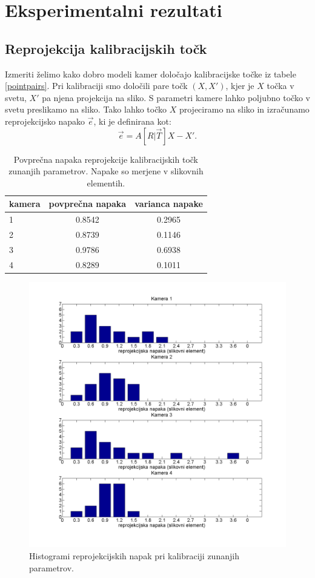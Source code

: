 \documentclass[a4paper, 12pt]{book}
\begin{document}
\chapter{Eksperimentalni rezultati}
\section{Reprojekcija kalibracijskih točk}\label{reprojectioncalibsection}
Izmeriti želimo kako dobro modeli kamer določajo kalibracijske točke iz tabele \ref{pointpairs}. Pri kalibraciji smo določili pare točk $(X, X')$, kjer je $X$ točka v svetu, $X'$ pa njena projekcija na sliko. S parametri kamere lahko poljubno točko v svetu preslikamo na sliko. Tako lahko točko $X$ projeciramo na sliko in izračunamo reprojekcijsko napako $\vec{e}$, ki je definirana kot:
\begin{equation}
\vec{e} = A[R|\vec{T}]X - X'.
\end{equation} 

\begin{table}
\centering
\begin{tabular}{| l | c | c |}
\hline
kamera & povprečna napaka & varianca napake \\
\hline
1 & 0.8542 & 0.2965 \\
2 & 0.8739 & 0.1146 \\
3 & 0.9786 & 0.6938 \\
4 & 0.8289 & 0.1011 \\
\hline
\end{tabular}
\caption{Povprečna napaka reprojekcije kalibracijskih točk zunanjih parametrov. Napake so merjene v slikovnih elementih.}
\label{errreptab}
\end{table}

\begin{figure}
\centering
\includegraphics[width=\textwidth,height=\textheight,keepaspectratio]{reprojected_bar.png}
\caption{Histogrami reprojekcijskih napak pri kalibraciji zunanjih parametrov.}
\label{reprojectedbarimg}
\end{figure}
\end{document}
